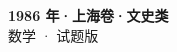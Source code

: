 \documentclass[zihao=-4, a4paper]{ctexart}
\begin{document}
\begin{center}
  {\Large\bfseries 1986 年·上海卷·文史类}\\[4pt]
  {\large 数学 · 试题版}
\end{center}
\medskip
{}

\end{document}
